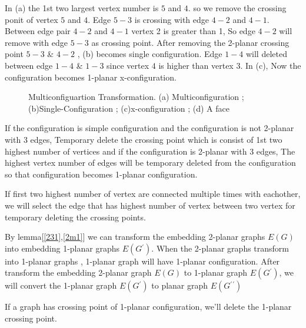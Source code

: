 \begin{enumerate}
In (a) the 1st two largest vertex number is $5$ and $4$. so we remove the crossing ponit of  vertex   $5$ and $4$. Edge $5-3$ is crossing with edge $4-2$ and $4-1$. Between edge pair $4-2$ and $4-1$ vertex 2 is greater than 1, So edge $4-2$ will remove with edge $5-3$ as crossing point. After removing the 2-planar crossing point $5-3$ \& $4-2$ , (b) becomes  single configuration.  Edge $1-4$ will deleted between edge $1-4$ \& $1-3$ since vertex $4$ is higher than vertex $3$. In (c), Now the configuration becomes 1-planar x-configuration.  

\begin{figure}[!tb]
\centering
\resizebox{150mm}{!}{}
\caption{Multiconfiguartion Transformation. (a) Multiconfiguration ; (b)Single-Configuration ; (c)x-configuration ; (d) A face}
\label{fig:multistar}
\end{figure}


\end{enumerate}

\begin{lemma}
\label{231}
If the configuration is simple configuration and the configuration is not 2-planar with 3 edges, Temporary delete the crossing point which is consist of 1st two highest number of vertices and if the configuration is 2-planar with 3 edges, The highest vertex number of edges will be temporary deleted from the  configuration so that configuration becomes 1-planar configuration.
\end{lemma}



\begin{lemma}
\label{2m1}
If first two highest number of vertex are connected multiple times with eachother, we will select the edge that has highest number of vertex between two vertex for temporary deleting the crossing points.
\end{lemma}

By lemma[\ref{231},\ref{2m1}] we can transform the embedding 2-planar graphs $E(G)$ into embedding 1-planar graphs $E(G{^\prime})$. When the 2-planar graphs transform into 1-planar graphs , 1-planar graph will have 1-planar configuration. After transform the embedding 2-planar graph $E(G)$ to 1-planar graph $E(G{^\prime})$, we will convert the 1-planar graph $E(G{^\prime})$ to planar graph $E(G{^\prime}{^\prime})$


\begin{lemma}
\label{1pcp}
If a graph has crossing point of 1-planar configuration, we'll delete the 1-planar crossing point.
\end{lemma}

